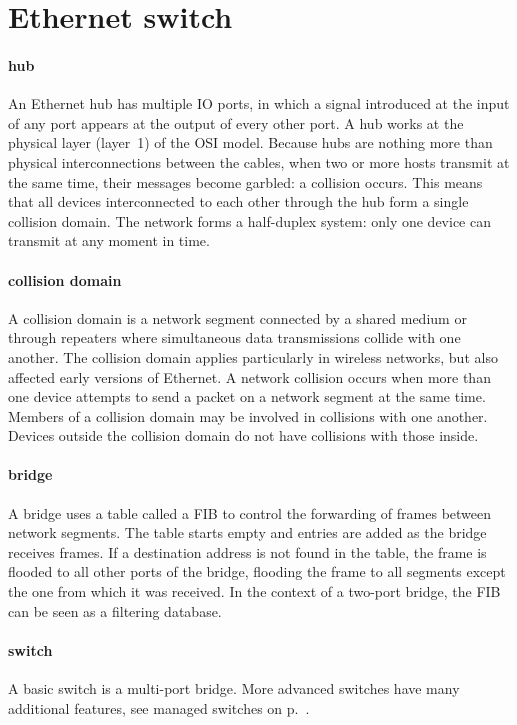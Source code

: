 \section{Ethernet switch}
\label{sec:ethernet-switch}

\paragraph{hub}
An Ethernet hub has multiple \ac{IO} ports, in which a signal introduced at the input of any port appears at the output of every other port.
A hub works at the physical layer (layer~1) of the \ac{OSI} model.
Because hubs are nothing more than physical interconnections between the cables, when two or more hosts transmit at the same time, their messages become garbled: a collision occurs.
This means that all devices interconnected to each other through the hub form a single collision domain.
The network forms a half-duplex system: only one device can transmit at any moment in time.

\paragraph{collision domain}
A collision domain is a network segment connected by a shared medium or through repeaters where simultaneous data transmissions collide with one another.
The collision domain applies particularly in wireless networks, but also affected early versions of Ethernet.
A network collision occurs when more than one device attempts to send a packet on a network segment at the same time.
Members of a collision domain may be involved in collisions with one another.
Devices outside the collision domain do not have collisions with those inside.

\paragraph{bridge}
A bridge uses a table called a \acf{FIB} to control the forwarding of frames between network segments.
The table starts empty and entries are added as the bridge receives frames.
If a destination address is not found in the table, the frame is flooded to all other ports of the bridge, flooding the frame to all segments except the one from which it was received.
In the context of a two-port bridge, the \acl{FIB} can be seen as a filtering database.

\paragraph{switch}
A basic switch is a multi-port bridge.
More advanced switches have many additional features, see managed switches on p.~\pageref{par:ethernet-switch-managed}.

